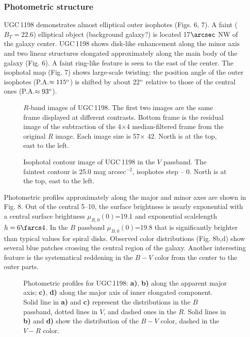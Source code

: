 \documentclass[]{aa}
\begin{document}
\subsubsection{Photometric structure}

UGC\,1198 demonstrates almost elliptical outer isophotes
(Figs. 6, 7). A faint ($B_T=22.6$) elliptical object (background galaxy?) 
is located 17$\arcsec$ NW of the galaxy center. UGC\,1198
shows disk-like enhancement along the minor axis and two linear
structures elongated approximately
along the main body of the galaxy (Fig. 6). A faint
ring-like feature is seen to the east of the center. 
The isophotal map (Fig. 7) shows large-scale twisting: the position angle
of the outer isophotes (P.A.$\approx115^{\rm o}$) is shifted by about
22$^{\rm o}$ relative to those of the central ones 
(P.A.$\approx93^{\rm o}$).

\begin{figure}
\centerline{}
\caption{$R$-band images of UGC\,1198. The first two images are
the same frame displayed at different contrasts. Bottom frame is
the residual image of the subtraction of the 4$\times$4
median-filtered frame from the original $R$ image. Each image size is 
57\arcsec $\times$ 42\arcsec. North is at the top, east to the left.
}
\end{figure}

\begin{figure}
\centerline{}
\caption{Isophotal contour image of UGC\,1198 in the $V$ passband.
The faintest contour is 25.0 mag arcsec$^{-2}$, isophotes step --
0. North is at the top, east to the left.
}
\end{figure}

Photometric profiles approximately along the major and minor axes
are shown in Fig. 8. Out of the central 5\arcsec--10\arcsec, the surface
brightness is nearly exponential with a central surface brightness
$\mu_{R,0}(0)$=19.1 and exponential scalelength $h=6\farcs4$.
In the $B$ passband $\mu_{B,0}(0)$=19.8 that is significantly
brighter than typical values for spiral disks. 
Observed color distributions (Fig. 8b,d) show several blue
patches crossing the central region of the galaxy. Another interesting
feature is the systematical reddening in the $B-V$ color from
the center to the outer parts. 

\begin{figure}
\centerline{}
\caption{Photometric profiles for UGC\,1198: {\bf a)}, {\bf b)}
along the apparent major axis;
{\bf c)}, {\bf d)} along the major axis of inner elongated component.
Solid line in {\bf a)} and {\bf c)} represent the distributions in
the $B$ passband, dotted lines in $V$, and dashed ones in the $R$.
Solid lines in {\bf b)} and {\bf d)} show the distribution of the
$B-V$ color, dashed in the $V-R$ color.}
\end{figure}
\end{document}
